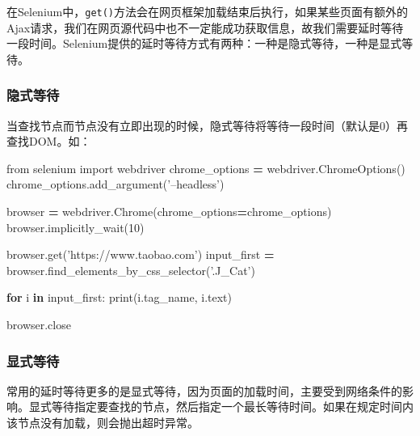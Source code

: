 \documentclass[]{ctexbook}
\newenvironment{Shaded}{\begin{snugshade}}{\end{snugshade}}
\newcommand{\BuiltInTok}[1]{#1}
\newcommand{\ControlFlowTok}[1]{\textcolor[rgb]{0.13,0.29,0.53}{\textbf{#1}}}
\newcommand{\DecValTok}[1]{\textcolor[rgb]{0.00,0.00,0.81}{#1}}
\newcommand{\ImportTok}[1]{#1}
\newcommand{\KeywordTok}[1]{\textcolor[rgb]{0.13,0.29,0.53}{\textbf{#1}}}
\newcommand{\NormalTok}[1]{#1}
\newcommand{\OperatorTok}[1]{\textcolor[rgb]{0.81,0.36,0.00}{\textbf{#1}}}
\newcommand{\StringTok}[1]{\textcolor[rgb]{0.31,0.60,0.02}{#1}}
\begin{document}
在Selenium中，\texttt{get()}方法会在网页框架加载结束后执行，如果某些页面有额外的Ajax请求，我们在网页源代码中也不一定能成功获取信息，故我们需要延时等待一段时间。Selenium提供的延时等待方式有两种：一种是隐式等待，一种是显式等待。

\hypertarget{ux9690ux5f0fux7b49ux5f85}{%
\subsubsection{隐式等待}\label{ux9690ux5f0fux7b49ux5f85}}

当查找节点而节点没有立即出现的时候，隐式等待将等待一段时间（默认是0）再查找DOM。如：

\begin{Shaded}
\begin{Highlighting}[]
\ImportTok{from}\NormalTok{ selenium }\ImportTok{import}\NormalTok{ webdriver}
\NormalTok{chrome_options }\OperatorTok{=}\NormalTok{ webdriver.ChromeOptions()}
\NormalTok{chrome_options.add_argument(}\StringTok{'--headless'}\NormalTok{)}

\NormalTok{browser }\OperatorTok{=}\NormalTok{ webdriver.Chrome(chrome_options}\OperatorTok{=}\NormalTok{chrome_options)}
\NormalTok{browser.implicitly_wait(}\DecValTok{10}\NormalTok{)}

\NormalTok{browser.get(}\StringTok{'https://www.taobao.com'}\NormalTok{)}
\NormalTok{input_first }\OperatorTok{=}\NormalTok{ browser.find_elements_by_css_selector(}\StringTok{'.J_Cat'}\NormalTok{)}

\ControlFlowTok{for}\NormalTok{ i }\KeywordTok{in}\NormalTok{ input_first:}
    \BuiltInTok{print}\NormalTok{(i.tag_name, i.text)}

\NormalTok{browser.close}
\end{Highlighting}
\end{Shaded}

\hypertarget{ux663eux5f0fux7b49ux5f85}{%
\subsubsection{显式等待}\label{ux663eux5f0fux7b49ux5f85}}

常用的延时等待更多的是显式等待，因为页面的加载时间，主要受到网络条件的影响。显式等待指定要查找的节点，然后指定一个最长等待时间。如果在规定时间内该节点没有加载，则会抛出超时异常。
\end{document}
